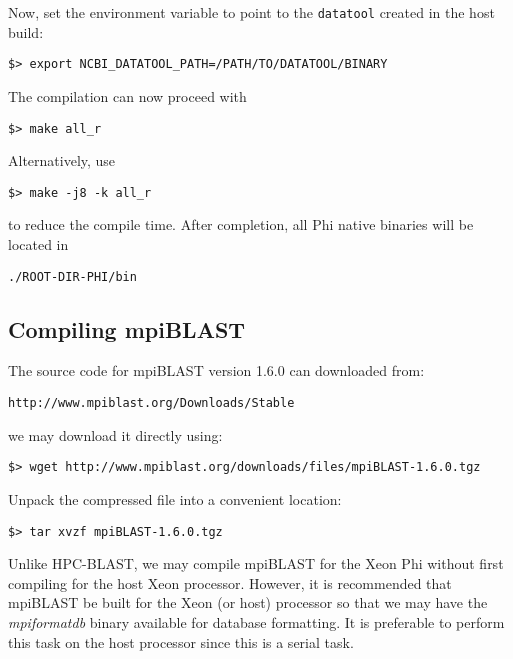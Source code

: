 \documentclass[10pt]{article}
\begin{document}
\noindent Now, set the environment variable to point to the \verb^datatool^ created in the host build:
\begin{verbatim}
$> export NCBI_DATATOOL_PATH=/PATH/TO/DATATOOL/BINARY
\end{verbatim}
\noindent The compilation can now proceed with
\begin{verbatim}
$> make all_r
\end{verbatim}
\noindent Alternatively, use
\begin{verbatim}
$> make -j8 -k all_r
\end{verbatim}
\noindent to reduce the compile time.  After completion, all Phi native binaries will be located in
\begin{verbatim}
./ROOT-DIR-PHI/bin
\end{verbatim}

\subsection{Compiling mpiBLAST} \label{sec:mpicomp}

The source code for mpiBLAST version 1.6.0 can downloaded from:
\begin{verbatim}
http://www.mpiblast.org/Downloads/Stable
\end{verbatim}
\noindent we may download it directly using:
\begin{verbatim}
$> wget http://www.mpiblast.org/downloads/files/mpiBLAST-1.6.0.tgz
\end{verbatim}
\noindent Unpack the compressed file into a convenient location:
\begin{verbatim}
$> tar xvzf mpiBLAST-1.6.0.tgz
\end{verbatim}

 Unlike HPC-BLAST, we may compile mpiBLAST for the Xeon Phi without first compiling for the host Xeon processor.  However, it is recommended that mpiBLAST be built for the Xeon (or host) processor so that we may
have the \emph{mpiformatdb} binary available for database formatting.  It is preferable to perform this task on the host processor since this is a serial task.
\end{document}
